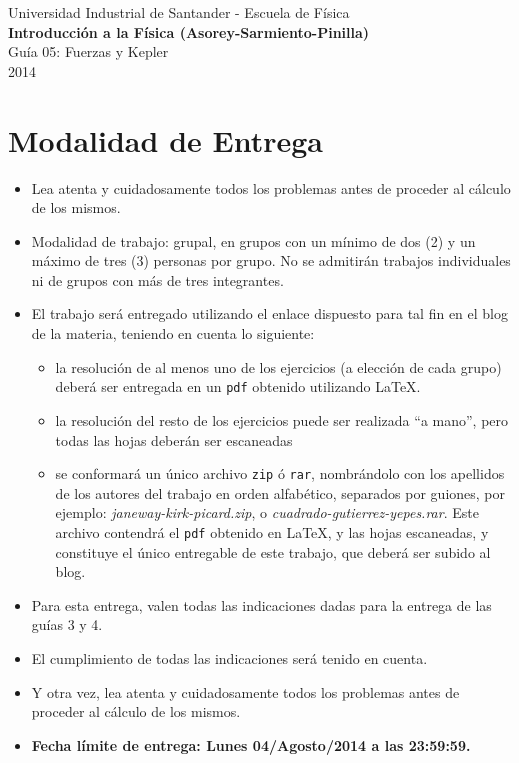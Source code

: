 \documentclass[a4paper,12pt]{article}
\begin{document}
\begin{center}
  {\small{Universidad Industrial de Santander - Escuela de Física}}\\
  {\bf{Introducción a la Física (Asorey-Sarmiento-Pinilla)}}\\
  \vspace{0.4cm}
  Guía 05: Fuerzas y Kepler\\ 2014
\end{center}

\renewcommand{\labelenumi}{\arabic{enumi})}
\renewcommand{\labelenumii}{\arabic{enumii})}

\section*{Modalidad de Entrega}

\begin{itemize}
  \item Lea atenta y cuidadosamente todos los problemas antes de proceder al cálculo de los mismos.
  \item Modalidad de trabajo: grupal, en grupos con un mínimo de dos (2) y un máximo de tres (3) personas por grupo. No se admitirán trabajos individuales ni de grupos con más de tres integrantes. 
  \item El trabajo será entregado utilizando el enlace dispuesto para tal fin en el blog de la materia, teniendo en cuenta lo siguiente:
  \begin{itemize}
    \item la resolución de al menos uno de los ejercicios (a elección de cada grupo) deberá ser entregada en un \texttt{pdf} obtenido utilizando \LaTeX.
    \item la resolución del resto de los ejercicios puede ser realizada ``a mano'', pero todas las hojas deberán ser escaneadas
    \item se conformará un único archivo \texttt{zip} ó \texttt{rar}, nombrándolo con los apellidos de los autores del trabajo en orden alfabético, separados por guiones, por ejemplo: \textit{janeway-kirk-picard.zip}, o \textit{cuadrado-gutierrez-yepes.rar}. Este archivo contendrá el \texttt{pdf} obtenido en \LaTeX, y las hojas escaneadas, y constituye el único entregable de este trabajo, que deberá ser subido al blog.
  \end{itemize}
  \item Para esta entrega, valen todas las indicaciones dadas para la entrega de las guías 3 y 4.
  \item El cumplimiento de todas las indicaciones será tenido en cuenta.
  \item Y otra vez, lea atenta y cuidadosamente todos los problemas antes de proceder al cálculo de los mismos.
  \item {\Large{\bf{Fecha límite de entrega: Lunes 04/Agosto/2014 a las 23:59:59.}}}
\end{itemize}
\end{document}

